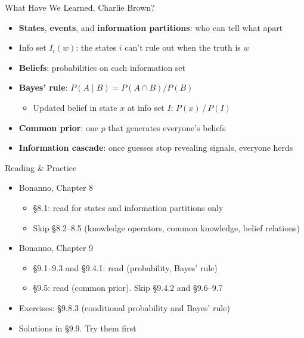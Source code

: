 \begin{frame}{What Have We Learned, Charlie Brown?}
\begin{itemize}
    \item \textbf{States}, \textbf{events}, and \textbf{information partitions}: who can tell what apart
    \item Info set $I_i(w)$: the states $i$ can't rule out when the truth is $w$
    \item \textbf{Beliefs}: probabilities on each information set
    \item \textbf{Bayes' rule}: $P(A\mid B)=P(A\cap B)/P(B)$
    \begin{itemize}
        \item Updated belief in state $x$ at info set $I$: $P(x)\,/\,P(I)$
    \end{itemize}
    \item \textbf{Common prior}: one $p$ that generates everyone's beliefs
    \item \textbf{Information cascade}: once guesses stop revealing signals, everyone herds
\end{itemize}
\vfill
\vspace{-0.4in}
\end{frame}

\begin{frame}{Reading \& Practice}
\begin{itemize}
    \item Bonanno, Chapter 8
    \begin{itemize}
        \item \S8.1: read for states and information partitions only
        \item Skip \S8.2--8.5 (knowledge operators, common knowledge, belief relations)
    \end{itemize}
    \item Bonanno, Chapter 9
    \begin{itemize}
        \item \S9.1--9.3 and \S9.4.1: read (probability, Bayes' rule)
        \item \S9.5: read (common prior). Skip \S9.4.2 and \S9.6--9.7
    \end{itemize}
    \item Exercises: \S9.8.3 (conditional probability and Bayes' rule)
    \item Solutions in \S9.9. Try them first
\end{itemize}
\vfill
\end{frame}


